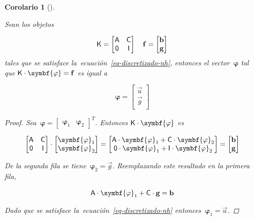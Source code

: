 \documentclass[
  12pt,
  a4paper,
  table]{scrbook}
\theoremstyle{plain}
\theoremstyle{definition}
\theoremstyle{plain}
\theoremstyle{plain}
\newtheorem{corollary}{Corolario}[chapter]
\theoremstyle{remark}
\begin{document}
\begin{corollary}[]\protect\hypertarget{cor-K-phi-nh}{}\label{cor-K-phi-nh}

Sean los objetos

\[
\mathsf{K} =
\begin{bmatrix}
\mathsf{A} & \mathsf{C} \\
\mathsf{0} & \mathsf{I} \\
\end{bmatrix}
\quad
\mathbf{f} =
\begin{bmatrix}
\mathbf{b} \\
\mathbf{g} \\
\end{bmatrix}
\] tales que se satisface la~ecuación~\ref{eq-discretizado-nh}, entonces
el vector~\(\symbf{\varphi}\) tal que
\(\mat{K} \cdot \symbf{\varphi} = \vec{f}\) es igual a

\[
\symbf{\varphi}
 =
\begin{bmatrix}
\vec{u} \\
\vec{g} \\
\end{bmatrix}
\]

\begin{proof}

Sea~\(\symbf{\varphi} = \begin{bmatrix} \symbf{\varphi}_1 & \symbf{\varphi}_2 \end{bmatrix}^T\).
Entonces \(\mat{K} \cdot \symbf{\varphi}\) es

\[
\begin{bmatrix}
\mat{A} & \mat{C} \\
\mat{0} & \mat{I}
\end{bmatrix}
\cdot
\begin{bmatrix}
\symbf{\varphi}_1 \\
\symbf{\varphi}_2 
\end{bmatrix}
=
\begin{bmatrix}
\mat{A} \cdot \symbf{\varphi}_1 + \mat{C} \cdot \symbf{\varphi}_2\\
\mat{0} \cdot \symbf{\varphi}_1 + \mat{I} \cdot \symbf{\varphi}_2
\end{bmatrix}
=
\begin{bmatrix}
\vec{b}\\
\vec{g}
\end{bmatrix}
\]

De la segunda fila se tiene~\(\symbf{\varphi}_2 = \vec{g}\).
Reemplazando este resultado en la primera fila,

\[
\mat{A} \cdot \symbf{\varphi}_1 + \mat{C} \cdot \vec{g} = \vec{b}
\]

Dado que se satisface la~ecuación~\ref{eq-discretizado-nh}
entonces~\(\symbf{\varphi}_1 = \vec{u}\).

\end{proof}

\end{corollary}
\end{document}
